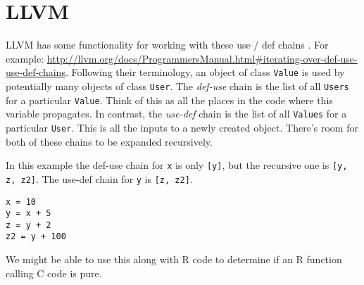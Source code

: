 \documentclass[12pt]{article}
\begin{document}
\section{LLVM}

LLVM has some functionality for working with these use / def chains
\cite{Lattner2004}. For example:
\url{http://llvm.org/docs/ProgrammersManual.html#iterating-over-def-use-use-def-chains}.
Following their terminology, an object of class \texttt{Value} is used by
potentially many objects of class \texttt{User}. The \emph{def-use} chain
is the list of all \texttt{Users} for a particular \texttt{Value}. Think
of this as all the places in the code where this variable propagates. In
contrast, the \emph{use-def} chain is the list of all \texttt{Values} for a
particular \texttt{User}. This is all the inputs to a newly
created object. There's room for both of these chains to be expanded recursively.

In this example the def-use chain for \texttt{x} is only \texttt{[y]}, but the
recursive one is \texttt{[y, z, z2]}. The use-def chain for \texttt{y} is
\texttt{[z, z2]}.

\begin{verbatim}
x = 10
y = x + 5
z = y + 2
z2 = y + 100
\end{verbatim}

We might be able to use this along with R code to determine if an R
function calling C code is pure.





 
\end{document}
